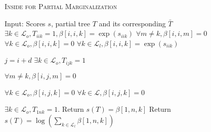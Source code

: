 \begin{algorithm}[t]
  \small
  \caption{\label{alg:partial_summation} \textsc{Inside for Partial Marginalization}}
  \begin{algorithmic}[1]
  
  \State Input: Scores $s$, partial tree $T$ and its corresponding $\bar{T}$
     
      \State $\exists k \in \mathcal{L}_o, T_{iik} = 1, \beta[i, i, k] = \exp(s_{iik})$   \label{alg:line_observed_1}  
      \State $\forall m \ne k, \beta[i, i, m] = 0 $
     \label{alg:line_latent_1}  
      \State $\forall k \in \mathcal{L}_o, \beta[i, i, k] = 0 $ \label{alg:line_latent_o_1}
      \State $\forall k \in \mathcal{L}_l, \beta[i, i, k] = \exp(s_{iik}) $ \label{alg:line_latent_l_1}
    \EndIf
  \EndFor

      \State $j = i + d$
        
        \State $\exists k \in \mathcal{L}_o, T_{ijk} = 1$ 
        \State {} \label{alg:line_observed_2}
        \State $\forall m \ne k, \beta[i, j, m] = 0 $
       \label{alg:line_latent_2} \label{alg:line_latent_2} 
        \State {}
        \State $\forall k \in \mathcal{L}_o, \beta[i, j, k] = 0 $ \label{alg:line_latent_o_2}
       \label{alg:line_rejected} 
        \State $\forall k \in \mathcal{L}, \beta[i, j, k] = 0 $ \label{alg:line_sum_end}
      \EndIf
    \EndFor
  \EndFor

    \label{alg:line_observed_3}  
    \State $\exists k \in \mathcal{L}_o, T_{1nk} = 1$. Return $s(T) = \beta[1, n, k]$
   \label{alg:line_latent_3} 
    \State Return $s(T) = \log(\sum_{k \in \mathcal{L}_l}\beta[1, n, k])$ \label{alg:line_latent_l_3}
  \EndIf
  
\end{algorithmic}
\end{algorithm} 
